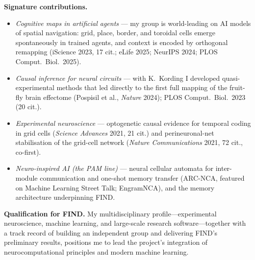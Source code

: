 \noindent\textbf{Signature contributions.}
\begin{itemize}[noitemsep,topsep=2pt]
  \item \textit{Cognitive maps in artificial agents} --- my group is world-leading on AI models of spatial navigation: grid, place, border, and toroidal cells emerge spontaneously in trained agents, and context is encoded by orthogonal remapping (iScience 2023, 17 cit.; eLife 2025; NeurIPS 2024; PLOS Comput.\ Biol.\ 2025).
  \item \textit{Causal inference for neural circuits} --- with K.\ Kording I developed quasi-experimental methods that led directly to the first full mapping of the fruit-fly brain effectome (Pospisil et al., \textit{Nature} 2024); PLOS Comput.\ Biol.\ 2023 (20 cit.).
  \item \textit{Experimental neuroscience} --- optogenetic causal evidence for temporal coding in grid cells (\textit{Science Advances} 2021, 21 cit.) and perineuronal-net stabilisation of the grid-cell network (\textit{Nature Communications} 2021, 72 cit., co-first).
  \item \textit{Neuro-inspired AI (the PAM line)} --- neural cellular automata for inter-module communication and one-shot memory transfer (ARC-NCA, featured on Machine Learning Street Talk; EngramNCA), and the memory architecture underpinning FIND.
\end{itemize}

\noindent\textbf{Qualification for FIND.} My multidisciplinary profile---experimental neuroscience, machine learning, and large-scale research software---together with a track record of building an independent group and delivering FIND's preliminary results, positions me to lead the project's integration of neurocomputational principles and modern machine learning.
